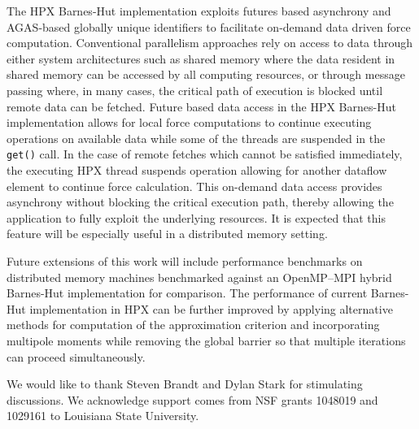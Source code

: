 \documentclass[floatfix]{revtex4}
\begin{document}
The HPX Barnes-Hut implementation exploits futures based asynchrony and AGAS-based
globally unique identifiers to facilitate on-demand data driven force computation. Conventional parallelism approaches
rely on access to data through either system architectures such as shared memory where the data resident in shared
memory can be accessed by all computing resources, or through message passing where, in many cases, the critical
path of execution is blocked until remote data can be fetched.
Future based data access in the HPX Barnes-Hut implementation
allows for local force computations to continue executing operations on
available data while some of the threads are suspended in the {\tt get()}
call.
In the case of remote fetches which cannot be satisfied immediately, the executing HPX thread suspends
operation allowing for another dataflow element to continue force calculation. This on-demand data access provides
asynchrony without blocking the critical execution path, thereby allowing the 
application to fully exploit the underlying resources. It is expected that this feature will be especially useful in a distributed memory setting.

Future extensions of this work will include performance benchmarks on distributed memory machines benchmarked against an
OpenMP--MPI hybrid Barnes-Hut implementation for comparison. 
The performance of current Barnes-Hut implementation in HPX can be further 
improved by applying alternative methods for computation of the 
approximation criterion  
and incorporating multipole moments while removing the global 
barrier so that multiple iterations can proceed simultaneously. 

We would like to thank Steven Brandt and Dylan Stark for stimulating discussions.
We acknowledge support comes from NSF grants 1048019 and 1029161 
to Louisiana State University.



\end{document}

